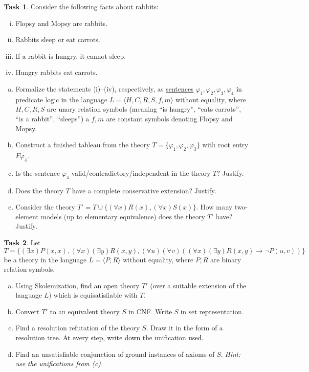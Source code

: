 \documentclass[a4paper]{amsart}
\theoremstyle{definition}
\newtheorem{task}{Task}
\begin{document}
\medskip
\begin{task}
Consider the following facts about rabbits:
\begin{enumerate}[(i)]
    \item Flopsy and Mopsy are rabbits.
    \item Rabbits sleep or eat carrots.
    \item If a rabbit is hungry, it cannot sleep.
    \item Hungry rabbits eat carrots.
\end{enumerate}
\begin{enumerate}[(a)]
\item Formalize the statements (i)--(iv), respectively, as \underline{sentences} $\varphi_1,\varphi_2,\varphi_3,\varphi_4$ in predicate logic in the language $L=\langle H, C, R, S, f, m \rangle$ without equality, where $H,C,R,S$ are unary relation symbols (meaning ``is hungry'', ``eats carrots'', ``is a rabbit'', ``sleeps'') a $f,m$ are constant symbols denoting Flopsy and Mopsy. 
\item Construct a finished tableau from the theory $T=\{\varphi_1,\varphi_2,\varphi_3\}$ with root entry $F\varphi_4$. 
\item Is the sentence $\varphi_4$ valid/contradictory/independent in the theory $T$? Justify. 
\item Does the theory $T$ have a complete conservative extension? Justify.
\item Consider the theory $T'=T\cup \{(\forall x)R(x),(\forall x)S(x)\}$. How many two-element models (up to elementary equivalence) does the theory $T'$ have? Justify.
\end{enumerate}
\end{task}


\medskip\begin{task}
Let $T=\{(\exists x)P(x,x), (\forall x)(\exists y)R(x,y),  (\forall u)(\forall v)((\forall x)(\exists y)R(x,y) \to \neg P(u,v))\}$ be a theory in the language $L=\langle P,R\rangle$ without equality, where $P,R$ are binary relation symbols.
\begin{enumerate}[(a)]
\item Using Skolemization, find an open theory $T'$ (over a suitable extension of the language $L$) which is equisatisfiable with $T$. 
\item Convert $T'$ to an equivalent theory $S$ in CNF. Write $S$ in set representation. 
\item Find a resolution refutation of the theory $S$. Draw it in the form of a resolution tree. At every step, write down the unification used. 
\item Find an unsatisfiable conjunction of ground instances of axioms of $S$. {\it Hint: use the unifications from (c).}
\end{enumerate}
\end{task}
\end{document}
